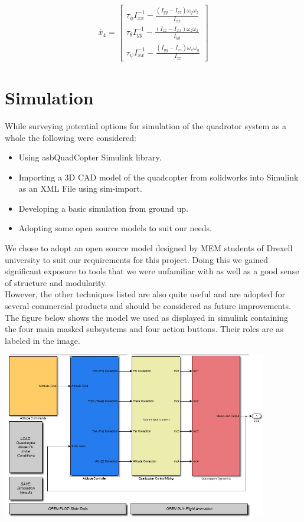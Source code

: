 \documentclass[9pt]{article}
\begin{document}
\begin{eqnarray}
\dot{x_{4}} =
\left[
\begin{matrix}
\tau_{\phi}I_{xx}^{-1} - \frac{(I_{yy}-I_{zz})\omega_{y}\omega_{z}}{I_{xx}} \\
\tau_{\theta}I_{yy}^{-1} - \frac{(I_{zz}-I_{xx})\omega_{z}\omega_{x}}{I_{yy}} \\
\tau_{\psi}I_{xx}^{-1} - \frac{(I_{yy}-I_{zz})\omega_{x}\omega_{y}}{I_{zz}} 
\end{matrix}
\right]
\end{eqnarray}

\part{Simulation}
While surveying potential options for simulation of the quadrotor system as a whole the following were considered:

\begin{itemize}
\item Using asbQuadCopter Simulink library.
\item Importing a 3D CAD model of the quadcopter from solidworks into Simulink as an XML File using sim-import.
\item Developing a basic simulation from ground up.
\item Adopting some open source models to suit our needs.
\end{itemize}

\noindent We chose to adopt an open source model designed by MEM students of Drexell university to suit our requirements for this project. Doing this we gained significant exposure to tools that we were unfamiliar with as well as a good sense of structure and modularity.\\
However, the other techniques listed are also quite useful and are adopted for several commercial products and should be considered as future improvements.\\
The figure below shows the model we used as displayed in simulink containing the four main masked subsystems and four action buttons. Their roles are as labeled in the image.\\

\begin{center}
\includegraphics[width=0.87\textwidth]{8.jpg}
\end{center}
\end{document}

